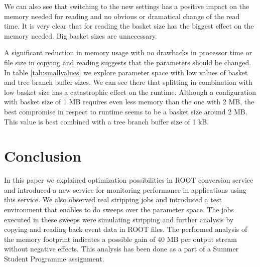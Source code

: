\documentclass[pdftex,a4paper]{article}
\begin{document}
We can also see that switching to the new settings has a positive impact on the memory needed for reading and no obvious or dramatical change of the read time. It is very clear that for reading the basket size has the biggest effect on the memory needed. Big basket sizes are unnecessary.

A significant reduction in memory usage with no drawbacks in processor time or file size in copying and reading suggests that the parameters should be changed. In table \ref{tab:smallvalues} we explore parameter space with low values of basket and tree branch buffer sizes. We can see there that splitting in combination with low basket size has a catastrophic effect on the runtime. Although a configuration with basket size of 1 MB requires even less memory than the one with 2 MB, the best compromise in respect to runtime seems to be a basket size around 2 MB. This value is best combined with a tree branch buffer size of 1 kB.

\section{Conclusion}
\label{sec:conclusion}
In this paper we explained optimization possibilities in ROOT conversion service and introduced a new service for monitoring performance in applications using this service. We also observed real stripping jobs and introduced a test environment that enables to do sweeps over the parameter space. The jobs executed in these sweeps were simulating stripping and further analysis by copying and reading back event data in ROOT files. The performed analysis of the memory footprint indicates a possible gain of 40 MB per output stream without negative effects. This analysis has been done as a part of a Summer Student Programme assignment.



\end{document}
